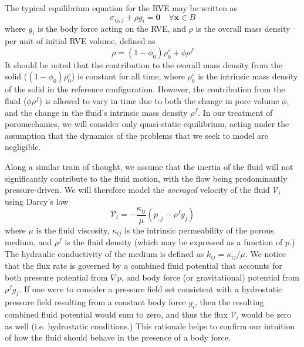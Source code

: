 \documentclass[11pt]{article} %
\begin{document}
The typical equilibrium equation for the RVE may be written as
\begin{equation}
	\sigma_{ij,j} + \rho g_i = \mathbf{0} \quad \forall \mathbf{x} \in B
\end{equation}
where $g_i$ is the body force acting on the RVE, and $\rho$ is the overall mass density per unit of initial RVE volume, defined as
\begin{equation}
	\rho = (1 - \phi_0) \rho^s_0 + \phi \rho^f
\end{equation}
It should be noted that the contribution to the overall mass density from the solid ($(1 - \phi_0) \rho^s_0$) is constant for all time, where $\rho^s_0$ is the intrinsic mass density of the solid in the reference configuration. However, the contribution from the fluid ($\phi \rho^f$) is allowed to vary in time due to both the change in pore volume $\phi$, and the change in the fluid's intrinsic mass density $\rho^f$. In our treatment of poromechanics, we will consider only quasi-static equilibrium, acting under the assumption that the dynamics of the problems that we seek to model are negligible.

Along a similar train of thought, we assume that the inertia of the fluid will not significantly contribute to the fluid motion, with the flow being predominantly pressure-driven. We will therefore model the \textit{averaged} velocity of the fluid $\mathcal{V}_i$ using Darcy's law
\begin{equation}
	\mathcal{V}_i = - \frac{\kappa_{ij}}{\mu} (p_{,j} - \rho^f g_j )
\end{equation}
where $\mu$ is the fluid viscosity, $\kappa_{ij}$ is the intrinsic permeability of the porous medium, and $\rho^f$ is the fluid density (which may be expressed as a function of $p$.) The hydraulic conductivity of the medium is defined as $k_{ij} = \kappa_{ij}/ \mu$. We notice that the flux rate is governed by a combined fluid potential that accounts for both pressure potential from $\nabla p$, and body force (or gravitational) potential from $\rho^f g_j$. If one were to consider a pressure field set consistent with a hydrostatic pressure field resulting from a constant body force $g_i$, then the resulting combined fluid potential would sum to zero, and thus the flux $\mathcal{V}_i$ would be zero as well (i.e. hydrostatic conditions.) This rationale helps to confirm our intuition of how the fluid should behave in the presence of a body force.
\end{document}
